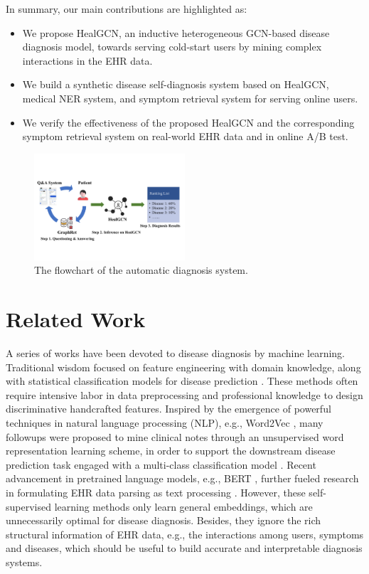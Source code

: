 \documentclass[sigconf]{acmart}
\begin{document}
In summary, our main contributions are highlighted as:
\begin{itemize}[leftmargin=*, itemsep=0pt, labelsep=5pt]
\item We propose HealGCN, an inductive heterogeneous GCN-based disease diagnosis model, towards serving cold-start users by mining complex interactions in the EHR data.

\item We build a synthetic disease self-diagnosis system based on HealGCN, medical NER system, and symptom retrieval system for serving online users.

\item We verify the effectiveness of the proposed HealGCN and the corresponding symptom retrieval system on real-world EHR data and in online A/B test.
\end{itemize}



\begin{figure}[t]
\centering
\includegraphics[width=0.5\textwidth]{fig4.pdf}
\caption{The flowchart of the automatic diagnosis system. \label{fig:4}}
\end{figure}

\section{Related Work}
A series of works have been devoted to disease diagnosis by machine learning. Traditional wisdom focused on feature engineering with domain knowledge, along with statistical classification models for disease prediction \cite{lin2009intelligent,soni2011predictive,weng2016disease,lixian2021}. These methods often require intensive labor in data preprocessing and professional knowledge to design discriminative handcrafted features. Inspired by the emergence of powerful techniques in natural language processing (NLP), e.g., Word2Vec \cite{mikolov2013efficient}, many followups were proposed to mine clinical notes through an unsupervised word representation learning scheme, in order to support the downstream disease prediction task engaged with a multi-class classification model \cite{choi2016learning,choi2016multi, farhan2016predictive,mullenbach2018explainable}. Recent advancement in pretrained language models, e.g., BERT \cite{devlin2018bert}, further fueled research in formulating EHR data parsing as text processing \cite{li2019behrt}. However, these self-supervised learning methods only learn general embeddings, which are  unnecessarily optimal for disease diagnosis. Besides, they ignore the rich structural information of EHR data, e.g., the interactions among users, symptoms and diseases, which should be useful to build accurate and interpretable diagnosis systems.
\end{document}
